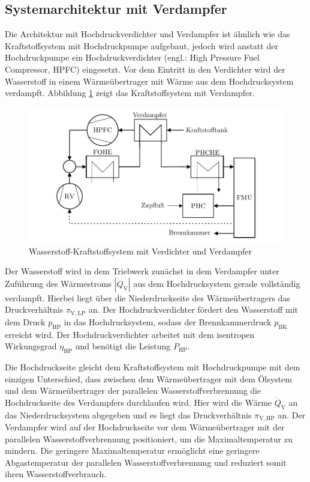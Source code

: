 \subsection{Systemarchitektur mit Verdampfer}

Die Architektur mit Hochdruckverdichter und Verdampfer ist ähnlich wie das Kraftstoffsystem mit Hochdruckpumpe aufgebaut, jedoch wird anstatt der Hochdruckpumpe ein Hochdruckverdichter (engl.: High Pressure Fuel Compressor, HPFC) eingesetzt. Vor dem Eintritt in den Verdichter wird der Wasserstoff in einem Wärmeübertrager mit Wärme aus dem Hochdrucksystem verdampft. Abbildung \ref{fig:verdampfer} zeigt das Kraftstoffsystem mit Verdampfer.

\begin{figure}[ht]
\centering
\includegraphics[width=0.85\linewidth]{4_Abbildungen/2_Hauptteil/Kraftstoffsystem Abbildungen/after.pdf}
  \caption{Wasserstoff-Kraftstoffsystem mit Verdichter und Verdampfer}
  \label{fig:verdampfer}
\end{figure}
\FloatBarrier 

Der Wasserstoff wird in dem Triebwerk zunächst in dem Verdampfer unter Zuführung des Wärmestroms $|\dot{Q}_\mathrm{V}|$ aus dem Hochdrucksystem gerade vollständig verdampft. Hierbei liegt über die Niederdruckseite des Wärmeübertragers das Druckverhältnis $\pi_{\mathrm{V,LP}}$ an. Der Hochdruckverdichter fördert den Wasserstoff mit dem Druck $p_{\mathrm{HP}}$ in das Hochdrucksystem, sodass der Brennkammerdruck $p_{\mathrm{BK}}$ erreicht wird. Der Hochdruckverdichter arbeitet mit dem isentropen Wirkungsgrad $\eta_{\mathrm{HP}}$ und benötigt die Leistung $P_{\mathrm{HP}}$. 

Die Hochdruckseite gleicht dem Kraftstoffsystem mit Hochdruckpumpe mit dem einzigen Unterschied, dass zwischen dem Wärmeübertrager mit dem Ölsystem und dem Wärmeübertrager der parallelen Wasserstoffverbrennung die Hochdruckseite des Verdampfers durchlaufen wird. Hier wird die Wärme $\dot{Q}_\mathrm{V}$ an das Niederdrucksystem abgegeben und es liegt das Druckverhältnis $\pi_{\mathrm{V,HP}}$ an. Der Verdampfer wird auf der Hochdruckseite vor dem Wärmeübertrager mit der parallelen Wasserstoffverbrennung positioniert, um die Maximaltemperatur zu mindern. Die geringere Maximaltemperatur ermöglicht eine geringere Abgastemperatur der parallelen Wasserstoffverbrennung und reduziert somit ihren Wasserstoffverbrauch. 

